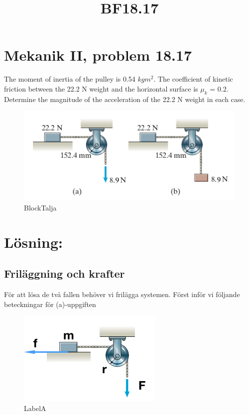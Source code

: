 \documentclass[11pt]{article}
\title{BF18.17}
\begin{document}
    
    \maketitle
    
    

    
    \hypertarget{mekanik-ii-problem-18.17}{%
\section{Mekanik II, problem 18.17}\label{mekanik-ii-problem-18.17}}

    The moment of inertia of the pulley is 0.54 \(kgm^2\). The coefficient
of kinetic friction between the 22.2 N weight and the horizontal surface
is \(\mu_k\) = 0.2. Determine the magnitude of the acceleration of the
22.2 N weight in each case.

\begin{figure}
\centering
\includegraphics{./BF18_17.png}
\caption{BlockTalja}
\end{figure}

    \hypertarget{luxf6sning}{%
\section{Lösning:}\label{luxf6sning}}

    \hypertarget{friluxe4ggning-och-krafter}{%
\subsection{Friläggning och krafter}\label{friluxe4ggning-och-krafter}}

För att lösa de två fallen behöver vi frilägga systemen. Först inför vi
följande beteckningar för (a)-uppgiften

\begin{figure}
\centering
\includegraphics{./BF18_17a.png}
\caption{LabelA}
\end{figure}
\end{document}
